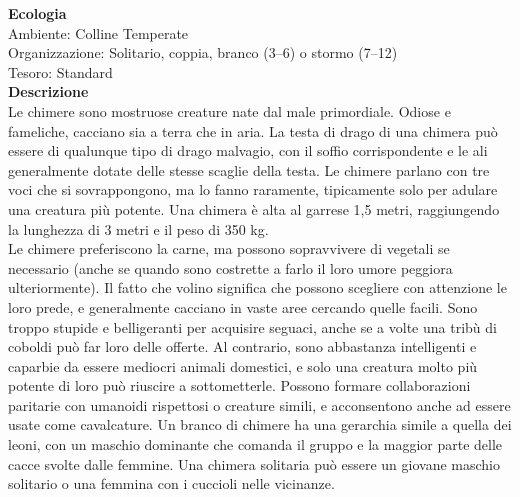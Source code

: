 \begin{multicols}{2}
\textbf{Ecologia}\\
Ambiente: Colline Temperate\\
Organizzazione: Solitario, coppia, branco (3–6) o stormo (7–12)\\
Tesoro: Standard\\
\textbf{Descrizione}\\
Le chimere sono mostruose creature nate dal male primordiale. Odiose e fameliche, cacciano sia a terra che in aria. La testa di drago di una chimera può essere di qualunque tipo di drago malvagio, con il soffio corrispondente e le ali generalmente dotate delle stesse scaglie della testa. Le chimere parlano con tre voci che si sovrappongono, ma lo fanno raramente, tipicamente solo per adulare una creatura più potente. Una chimera è alta al garrese 1,5 metri, raggiungendo la lunghezza di 3 metri e il peso di 350 kg.\\
Le chimere preferiscono la carne, ma possono sopravvivere di vegetali se necessario (anche se quando sono costrette a farlo il loro umore peggiora ulteriormente). Il fatto che volino significa che possono scegliere con attenzione le loro prede, e generalmente cacciano in vaste aree cercando quelle facili. Sono troppo stupide e belligeranti per acquisire seguaci, anche se a volte una tribù di coboldi può far loro delle offerte. Al contrario, sono abbastanza intelligenti e caparbie da essere mediocri animali domestici, e solo una creatura molto più potente di loro può riuscire a sottometterle. Possono formare collaborazioni paritarie con umanoidi rispettosi o creature simili, e acconsentono anche ad essere usate come cavalcature. Un branco di chimere ha una gerarchia simile a quella dei leoni, con un maschio dominante che comanda il gruppo e la maggior parte delle cacce svolte dalle femmine. Una chimera solitaria può essere un giovane maschio solitario o una femmina con i cuccioli nelle vicinanze.\\


\end{multicols}
